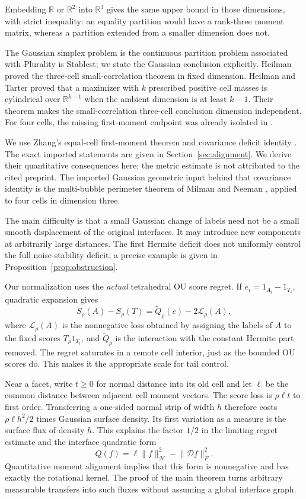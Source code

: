 \documentclass[11pt,reqno]{amsart}
\theoremstyle{remark}
\newcommand{\R}{\mathbb R}
\newcommand{\norm}[1]{\lVert #1\rVert}
\newcommand{\LL}{\mathcal L}
\newcommand{\HH}{\mathcal H}
\newcommand{\DD}{\mathcal D}
\begin{document}
Embedding $\R$ or $\R^2$ into $\R^3$ gives the same upper bound in those
dimensions, with strict inequality: an equality partition would have a
rank-three moment matrix, whereas a partition extended from a smaller
dimension does not.

The Gaussian simplex problem is the continuous partition problem associated
with Plurality is Stablest; we state the Gaussian conclusion explicitly.
Heilman \cite{Heilman14} proved the three-cell small-correlation theorem
in fixed dimension. Heilman and Tarter \cite{HT} proved that a maximizer
with $k$ prescribed positive cell masses is cylindrical over $\R^{k-1}$
when the ambient dimension is at least $k-1$. Their theorem makes the
small-correlation three-cell conclusion dimension independent.
For four cells, the missing first-moment endpoint was already isolated in
\cite[Section~8, Conjecture~3]{Heilman14}.

We use Zhang's equal-cell first-moment theorem and covariance deficit
identity \cite{Zhang}. The exact imported statements are given in
Section~\ref{sec:alignment}. We derive their quantitative consequences
here; the metric estimate is not attributed to the cited preprint.
The imported Gaussian geometric input behind that covariance identity is
the multi-bubble perimeter theorem of Milman and Neeman
\cite[Theorem~1.1]{MN}, applied to four cells in dimension three.

The main difficulty is that a small Gaussian change of labels need not
be a small smooth displacement of the original interfaces. It may introduce
new components at arbitrarily large distances. The first Hermite deficit
does not uniformly control the full noise-stability deficit; a precise
example is given in Proposition~\ref{prop:obstruction}.

Our normalization uses the \emph{actual} tetrahedral OU score regret.
If $e_i=1_{A_i}-1_{T_i}$, quadratic expansion gives
\begin{equation}\label{eq:comparison-intro}
 S_\rho(A)-S_\rho(T)=\widetilde Q_\rho(e)-2\LL_\rho(A),
\end{equation}
where $\LL_\rho(A)$ is the nonnegative loss obtained by assigning the
labels of $A$ to the fixed scores $T_\rho1_{T_i}$, and
$\widetilde Q_\rho$ is the interaction with the constant Hermite part
removed. The regret saturates in a remote cell interior, just as the
bounded OU scores do. This makes it the appropriate scale for tail control.

Near a facet, write $t\ge0$ for normal distance into its old cell and
let $\ell$ be the common distance between adjacent cell moment vectors.
The score loss is $\rho\ell t$ to first order. Transferring a one-sided
normal strip of width $h$ therefore costs
$\rho\ell h^2/2$ times Gaussian surface density. Its first variation
as a measure is the surface flux of density $h$. This explains the factor
$1/2$ in the limiting regret estimate and the interface quadratic form
\[
 Q(f)=\ell\norm{f}_{\HH}^2-\norm{\DD f}_F^2.
\]
Quantitative moment alignment implies that this form is nonnegative and
has exactly the rotational kernel. The proof of the main theorem turns
arbitrary measurable transfers into such fluxes without assuming a global
interface graph.
\end{document}
